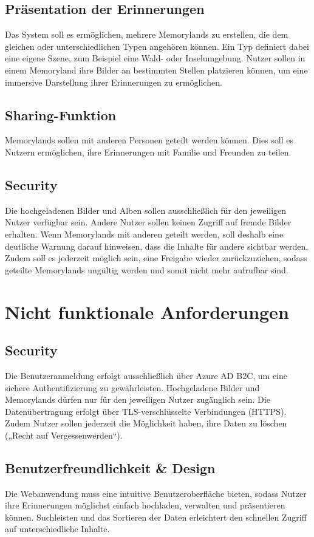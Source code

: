 \subsection{Präsentation der Erinnerungen}

Das System soll es ermöglichen, mehrere Memorylands zu erstellen, die dem 
gleichen oder unterschiedlichen Typen angehören können. Ein Typ definiert 
dabei eine eigene Szene, zum Beispiel eine Wald- oder Inselumgebung. Nutzer sollen
in einem Memoryland ihre Bilder an bestimmten Stellen platzieren können, um 
eine immersive Darstellung ihrer Erinnerungen zu ermöglichen.

\subsection{Sharing-Funktion}

Memorylands sollen mit anderen Personen geteilt werden können. Dies soll es 
Nutzern ermöglichen, ihre Erinnerungen mit Familie und Freunden zu teilen.

\subsection{Security}

Die hochgeladenen Bilder und Alben sollen ausschlie\ss{}lich für den jeweiligen Nutzer verfügbar
sein. Andere Nutzer sollen keinen Zugriff auf fremde Bilder erhalten. Wenn Memorylands mit 
anderen geteilt werden, soll deshalb eine deutliche Warnung darauf hinweisen, dass die Inhalte
für andere sichtbar werden. Zudem soll es jederzeit möglich sein, eine Freigabe wieder 
zurückzuziehen, sodass geteilte Memorylands ungültig werden und somit nicht mehr 
aufrufbar sind.

\section{Nicht funktionale Anforderungen}


\subsection{Security}

Die Benutzeranmeldung erfolgt ausschlie\ss{}lich über Azure AD B2C, um eine sichere 
Authentifizierung zu gewährleisten. Hochgeladene Bilder und Memorylands dürfen nur 
für den jeweiligen Nutzer zugänglich sein. Die Datenübertragung erfolgt über 
TLS-verschlüsselte Verbindungen (HTTPS). Zudem Nutzer sollen jederzeit die Möglichkeit
haben, ihre Daten zu löschen („Recht auf Vergessenwerden“).

\subsection{Benutzerfreundlichkeit \& Design}

Die Webanwendung muss eine intuitive Benutzeroberfläche bieten, sodass Nutzer ihre 
Erinnerungen möglichst einfach hochladen, verwalten und präsentieren können. 
Suchleisten und das Sortieren der Daten erleichtert den schnellen Zugriff auf 
unterschiedliche Inhalte.

